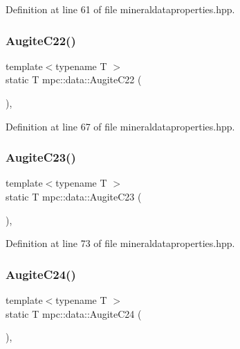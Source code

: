 Definition at line 61 of file mineraldataproperties.\+hpp.

\mbox{\label{namespacempc_1_1data_a2f04755de801e6346c221171ba0c3968}} 
\subsubsection{\texorpdfstring{Augite\+C22()}{AugiteC22()}}
{\footnotesize\ttfamily template$<$typename T $>$ \\
static T mpc\+::data\+::\+Augite\+C22 (\begin{DoxyParamCaption}{ }\end{DoxyParamCaption})\hspace{0.3cm}{\ttfamily [inline]}, {\ttfamily [static]}}



Definition at line 67 of file mineraldataproperties.\+hpp.

\mbox{\label{namespacempc_1_1data_a8a954ec986d04b54100564aee10f66c1}} 
\subsubsection{\texorpdfstring{Augite\+C23()}{AugiteC23()}}
{\footnotesize\ttfamily template$<$typename T $>$ \\
static T mpc\+::data\+::\+Augite\+C23 (\begin{DoxyParamCaption}{ }\end{DoxyParamCaption})\hspace{0.3cm}{\ttfamily [inline]}, {\ttfamily [static]}}



Definition at line 73 of file mineraldataproperties.\+hpp.

\mbox{\label{namespacempc_1_1data_ac1713a0302180a0455721a3782d5a034}} 
\subsubsection{\texorpdfstring{Augite\+C24()}{AugiteC24()}}
{\footnotesize\ttfamily template$<$typename T $>$ \\
static T mpc\+::data\+::\+Augite\+C24 (\begin{DoxyParamCaption}{ }\end{DoxyParamCaption})\hspace{0.3cm}{\ttfamily [inline]}, {\ttfamily [static]}}



